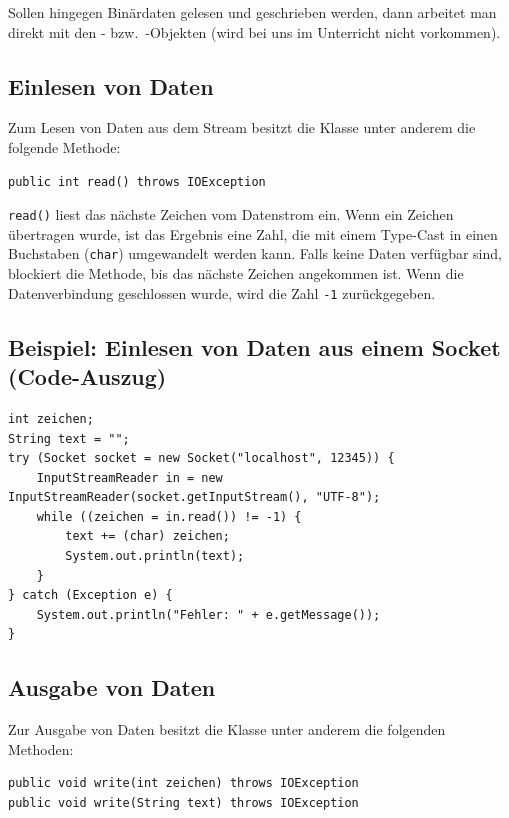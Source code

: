 Sollen hingegen Binärdaten gelesen und geschrieben werden, dann arbeitet man
direkt mit den - bzw.\ -Objekten
(wird bei uns im Unterricht nicht vorkommen).

\subsection{Einlesen von Daten}

Zum Lesen von Daten aus dem Stream besitzt die Klasse
 unter anderem die folgende Methode:

\begin{lstlisting}
public int read() throws IOException
\end{lstlisting}

\lstinline|read()| liest das nächste Zeichen vom Datenstrom ein. Wenn ein
Zeichen übertragen wurde, ist das Ergebnis eine Zahl, die mit einem Type-Cast
in einen Buchstaben (\lstinline|char|) umgewandelt werden kann. Falls keine
Daten verfügbar sind, blockiert die Methode, bis das nächste Zeichen angekommen
ist. Wenn die Datenverbindung geschlossen wurde, wird die Zahl \lstinline|-1|
zurückgegeben.

\subsection{Beispiel: Einlesen von Daten aus einem Socket (Code-Auszug)}

\begin{lstlisting}
int zeichen;
String text = "";
try (Socket socket = new Socket("localhost", 12345)) {
    InputStreamReader in = new InputStreamReader(socket.getInputStream(), "UTF-8"); 
    while ((zeichen = in.read()) != -1) {
        text += (char) zeichen;
        System.out.println(text);
    }	
} catch (Exception e) {
    System.out.println("Fehler: " + e.getMessage());
}
\end{lstlisting}

\subsection{Ausgabe von Daten}

Zur Ausgabe von Daten besitzt die Klasse  unter
anderem die folgenden Methoden:

\begin{lstlisting}
public void write(int zeichen) throws IOException
public void write(String text) throws IOException
\end{lstlisting}

